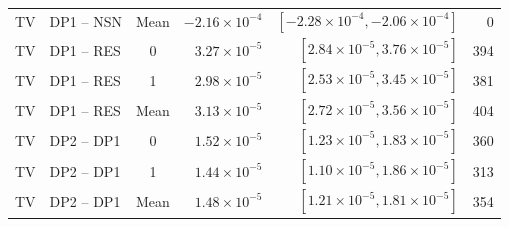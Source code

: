 \begin{tabular}{@{}llcrrr@{}}
TV & DP1 -- NSN & Mean & $-2.16\times10^{-4}$ & $[-2.28\times10^{-4}, -2.06\times10^{-4}]$ & 0 \\
TV & DP1 -- RES & 0 & $3.27\times10^{-5}$ & $[2.84\times10^{-5}, 3.76\times10^{-5}]$ & 394 \\
TV & DP1 -- RES & 1 & $2.98\times10^{-5}$ & $[2.53\times10^{-5}, 3.45\times10^{-5}]$ & 381 \\
TV & DP1 -- RES & Mean & $3.13\times10^{-5}$ & $[2.72\times10^{-5}, 3.56\times10^{-5}]$ & 404 \\
TV & DP2 -- DP1 & 0 & $1.52\times10^{-5}$ & $[1.23\times10^{-5}, 1.83\times10^{-5}]$ & 360 \\
TV & DP2 -- DP1 & 1 & $1.44\times10^{-5}$ & $[1.10\times10^{-5}, 1.86\times10^{-5}]$ & 313 \\
TV & DP2 -- DP1 & Mean & $1.48\times10^{-5}$ & $[1.21\times10^{-5}, 1.81\times10^{-5}]$ & 354 \\
\bottomrule
\end{tabular}\endgroup
